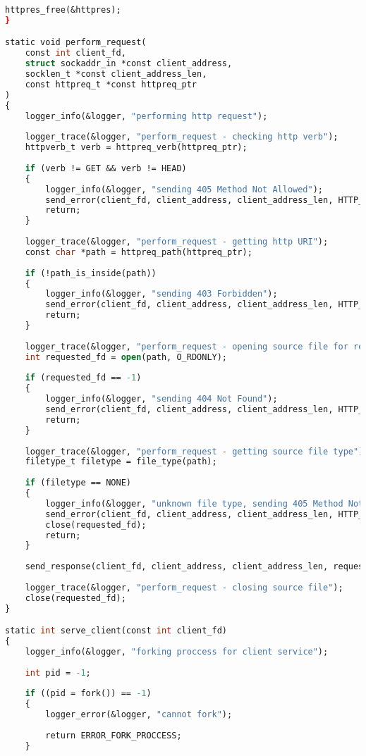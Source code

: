 \begin{lstlisting}[label=server_code,caption=Реализация статического веб-сервера,language=Caml]
	httpres_free(&httpres);
}

static void perform_request(
	const int client_fd,
	struct sockaddr_in *const client_address,
	socklen_t *const client_address_len,
	const httpreq_t *const httpreq_ptr
)
{
	logger_info(&logger, "performing http request");
	
	logger_trace(&logger, "perform_request - checking http verb");
	httpverb_t verb = httpreq_verb(httpreq_ptr);
	
	if (verb != GET && verb != HEAD)
	{
		logger_info(&logger, "sending 405 Method Not Allowed");
		send_error(client_fd, client_address, client_address_len, HTTP_CODE_METHOD_NOT_ALLOWED, "Method not allowed");
		return;
	}
	
	logger_trace(&logger, "perform_request - getting http URI");
	const char *path = httpreq_path(httpreq_ptr);
	
	if (!path_is_inside(path))
	{
		logger_info(&logger, "sending 403 Forbidden");
		send_error(client_fd, client_address, client_address_len, HTTP_CODE_FORBIDDEN, "Forbidden");
		return;
	}
	
	logger_trace(&logger, "perform_request - opening source file for reading");
	int requested_fd = open(path, O_RDONLY);
	
	if (requested_fd == -1)
	{
		logger_info(&logger, "sending 404 Not Found");
		send_error(client_fd, client_address, client_address_len, HTTP_CODE_NOT_FOUND, "Not found");
		return;
	}
	
	logger_trace(&logger, "perform_request - getting source file type");
	filetype_t filetype = file_type(path);
	
	if (filetype == NONE)
	{
		logger_info(&logger, "unknown file type, sending 405 Method Not Allowed");
		send_error(client_fd, client_address, client_address_len, HTTP_CODE_METHOD_NOT_ALLOWED, "Method not allowed");
		close(requested_fd);
		return;
	}
	
	send_response(client_fd, client_address, client_address_len, requested_fd, filetype, verb);
	
	logger_trace(&logger, "perform_request - closing source file");
	close(requested_fd);
}

static int serve_client(const int client_fd)
{
	logger_info(&logger, "forking proccess for client service");
	
	int pid = -1;
	
	if ((pid = fork()) == -1)
	{
		logger_error(&logger, "cannot fork");
		
		return ERROR_FORK_PROCCESS;
	}
	

\end{lstlisting}
